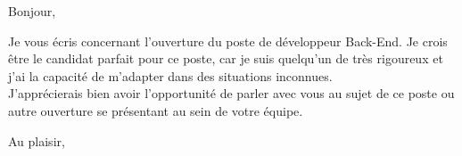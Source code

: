 \documentclass[12pt,french]{letter}
\begin{document}

\begin{letter}{}
\address{Montréal, Canada}

\opening{Bonjour,}


Je vous écris concernant l'ouverture du poste de développeur Back-End.
Je crois être le candidat parfait pour ce poste, car je suis quelqu'un de très rigoureux et j'ai la capacité de m'adapter dans des situations inconnues.\\
J'apprécierais bien avoir l'opportunité de parler avec vous au sujet de ce poste ou autre ouverture se présentant au sein de votre équipe.
\signature{Maxime}

\closing{Au plaisir,}


\end{letter}
\end{document}

